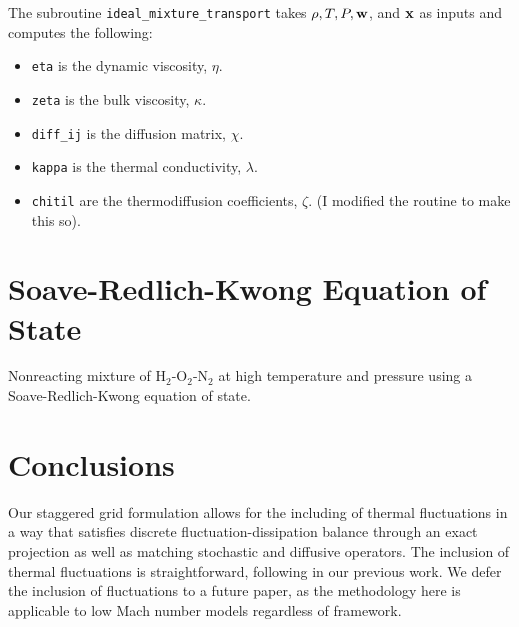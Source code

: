 \documentclass[final]{siamltex}
\def\wb {{\bf w}}
\def\xb {{\bf x}}
\begin{document}
The subroutine {\tt ideal\_mixture\_transport} takes $\rho,T,P,\wb$, and $\xb$ 
as inputs and computes the following:\\
\begin{itemize}

\item {\tt eta} is the dynamic viscosity, $\eta$.\\

\item {\tt zeta} is the bulk viscosity, $\kappa$.\\

\item {\tt diff\_ij} is the diffusion matrix, $\chi$.\\

\item {\tt kappa} is the thermal conductivity, $\lambda$.\\

\item {\tt chitil} are the thermodiffusion coefficients, $\zeta$.
                   (I modified the routine to make this so).\\

\end{itemize}

\section{Soave-Redlich-Kwong Equation of State}

Nonreacting mixture of H$_2$-O$_2$-N$_2$ at high temperature and pressure
using a Soave-Redlich-Kwong equation of state.

\section{Conclusions}

Our staggered grid formulation allows for the including of thermal fluctuations
in a way that satisfies discrete fluctuation-dissipation balance through an
exact projection as well as matching stochastic and diffusive operators.
The inclusion of thermal fluctuations is straightforward, following in our previous work.
We defer the inclusion of fluctuations to a future paper, as
the methodology here is applicable to low Mach number models regardless of framework.



\end{document}
